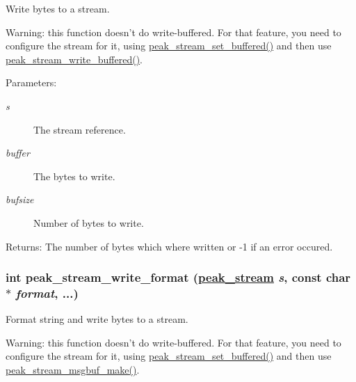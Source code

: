 Write bytes to a stream. 

Warning: this function doesn't do write-buffered. For that feature, you need to configure the stream for it, using \hyperlink{group__stream__buf_ga54}{peak\_\-stream\_\-set\_\-buffered()} and then use \hyperlink{group__stream__buf_ga56}{peak\_\-stream\_\-write\_\-buffered()}.

\begin{Desc}
\item[Parameters:]
\begin{description}
\item[{\em s}]The stream reference. \item[{\em buffer}]The bytes to write. \item[{\em bufsize}]Number of bytes to write.\end{description}
\end{Desc}
\begin{Desc}
\item[Returns:]The number of bytes which where written or -1 if an error occured. \end{Desc}
\hypertarget{group__stream__low_ga3}{
\subsubsection[peak\_\-stream\_\-write\_\-format]{\setlength{\rightskip}{0pt plus 5cm}int peak\_\-stream\_\-write\_\-format (\hyperlink{group__stream_ga0}{peak\_\-stream} {\em s}, const char $\ast$ {\em format}, ...)}}
\label{group__stream__low_ga3}


Format string and write bytes to a stream. 

Warning: this function doesn't do write-buffered. For that feature, you need to configure the stream for it, using \hyperlink{group__stream__buf_ga54}{peak\_\-stream\_\-set\_\-buffered()} and then use \hyperlink{group__stream__buf_ga59}{peak\_\-stream\_\-msgbuf\_\-make()}.

